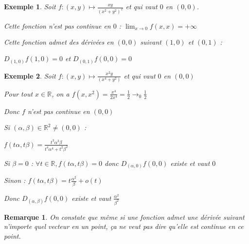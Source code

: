 \documentclass[a4paper,12pt]{book}
\newtheorem{Exe}{Exemple}[section]
\newtheorem{Rem}{Remarque}[section]
\def\R{\mathbb{R}}
\begin{document}
\begin{Exe}
Soit $f:(x,y)\mapsto \frac{xy}{(x^2+y^2)^2}$ et qui vaut $0$ en $(0,0)$.
\par Cette fonction n'est pas continue en $0$ : $\lim_{x\to 0} f(x, x) = +\infty$
\par Cette fonction admet des dérivées en $(0,0)$ suivant $(1,0)$ et $(0,1)$ :
\par $D_{(1,0)}f(1,0) = 0$ et $D_{(0, 1)}f(0, 0) = 0$
\end{Exe}
\begin{Exe}
Soit $f:(x, y)\mapsto \frac{x^2y}{(x^4+y^2)}$ et qui vaut $0$ en $(0,0)$
\par Pour tout $x\in\R$, on a $f(x, x^2) = \frac{x^4}{2x^4}=\frac{1}{2}\to_0\frac{1}{2}$
\par Donc $f$ n'est pas continue en $(0,0)$
\par Si $(\alpha,\beta)\in\R^2\neq (0,0)$ :
\par $f(t\alpha,t\beta) = \frac{t^3\alpha^3\beta}{t^4\alpha^4+t^2\beta^2}$
\par Si $\beta = 0$ : $\forall t\in\R, f(t\alpha, t\beta)=0$ donc $D_{(\alpha, 0)}f(0,0)$ existe et vaut $0$
\par Sinon : $f(t\alpha,t\beta) =t\frac{\alpha^2}{\beta} + o(t)$
\par Donc $D_{(\alpha, \beta)}f(0,0)$ existe et vaut $\frac{\alpha^2}{\beta^2}$
\end{Exe}
\begin{Rem}
On constate que même si une fonction admet une dérivée suivant n'importe quel vecteur en un point, ça ne veut pas dire qu'elle est continue en ce point.
\end{Rem}
\end{document}
